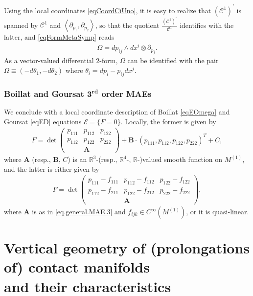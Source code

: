 \documentclass[10pt,a4paper]{amsart}
\newcommand{\R}{\mathbb{R}}
\newcommand{\C}{\mathcal{C}}
\newcommand{\A}{\boldsymbol{A}}
\newcommand{\E}{\mathcal{E}}
\newcommand{\B}{\boldsymbol{B}}
\newcommand{\Span}[1]{\left\langle #1 \right\rangle}
\newcommand{\Rd}{^\textrm{rd}}
\newcommand{\p}{\varrho}
\numberwithin{equation}{section}
\begin{document}
Using the local coordinates
\eqref{eqCoordCiUno}, it is easy to realize that $(\C^{1})^\prime$ is spanned by $\C^1$ and $\Span{\partial_{p_1},\partial_{p_2}}$, so that the quotient $\frac{(\C^{1})^\prime}{\C^1}$ identif\/ies with the latter, and \eqref{eqFormMetaSymp} reads
 \begin{gather}\label{eqFormMetaSympLOC}
\Omega=dp_{ij} \wedge dx^i \otimes\partial_{p_j}.
\end{gather}
As a vector-valued dif\/ferential 2-form, $\Omega$ can be identif\/ied with the pair $\Omega \equiv (-d\theta_1,-d\theta_2)$
where $\theta_i=dp_i-p_{ij}dx^j$.

\subsubsection[Boillat and Goursat $3\Rd$ order MAEs]{Boillat and Goursat $\boldsymbol{3\Rd}$ order MAEs}

We conclude with a local coordinate description of Boillat \eqref{eqEOmega} and Goursat \eqref{eqED} equations $\E=\{F=0\}$.
Locally, the former is given by
\begin{gather}\label{eq.general.MAE.3}
F=\det\left(\begin{matrix}p_{111} & p_{112} & p_{122} \\p_{112} & p_{122} & p_{222} \\ & \A & \end{matrix}\right)+\B\cdot (p_{111},p_{112},p_{122},p_{222})^T+C,
\end{gather}
where $ \A$ (resp., $\B$, $C$) is an $\R^3$-(resp., $\R^4$-, $\R$-)valued smooth function on $M^{(1)}$,
and the latter is either given by
 \begin{gather}\label{eqGoursat}
 F=\det\left(\begin{matrix}p_{111}-f_{111} & p_{112}-f_{112} & p_{122}-f_{122} \\p_{112}-f_{211} & p_{122}-f_{212} & p_{222}-f_{222} \\ & \A & \end{matrix}\right),
\end{gather}
where $\A$ is as in \eqref{eq.general.MAE.3} and $f_{ijk}\in C^\infty(M^{(1)})$, or it is quasi-linear.

\section[Vertical geometry of (prolongations of) contact manifolds and their characteristics]{Vertical geometry of (prolongations of) contact manifolds\\ and their characteristics}\label{secCono}
\end{document}
